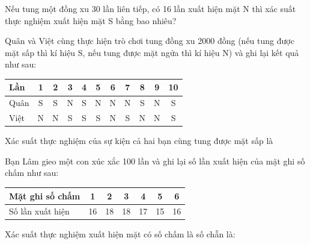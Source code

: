 \begin{ex}
	Nếu tung một đồng xu  30 lần liên tiếp, có 16  lần xuất hiện mặt N thì xác suất thực nghiệm xuất hiện mặt S bằng bao nhiêu?
\end{ex}
\begin{ex}
	Quân và Việt cùng thực hiện trò chơi tung đồng xu  2000 đồng (nếu tung được mặt sấp thì kí hiệu S, nếu tung được mặt ngửa thì kí hiệu N) và ghi lại kết quả như sau:
	\begin{center}
		\begin{tabular}{|l|c|c|c|c|c|c|c|c|c|c|}
			\hline
			Lần &1&2&3&4&5&6&7&8&9&10\\
			\hline
			Quân&S&S&N&S&N&N&N&S&N&S\\
			\hline
			Việt&N&N&S&S&S&N&S&N&N&S\\
			\hline
		\end{tabular}
	\end{center}
	Xác suất thực nghiệm của sự kiện cả hai bạn cùng tung được mặt sấp là
\end{ex}
\begin{ex}
	Bạn Lâm gieo một con xúc xắc 100 lần và ghi lại số lần xuất hiện của mặt ghi số chấm như sau:
	\begin{center}
		\begin{tabular}{|l|c|c|c|c|c|c|}
			\hline
			Mặt ghi số chấm& 	1&	2&	3&	4&	5&	6\\
			\hline
			Số lần xuất hiện&	16&	18&	18&	17&	15&	16\\
			\hline
		\end{tabular}
	\end{center}
	Xác suất thực nghiệm xuất hiện mặt có số chấm là số chẵn là:
\end{ex}
